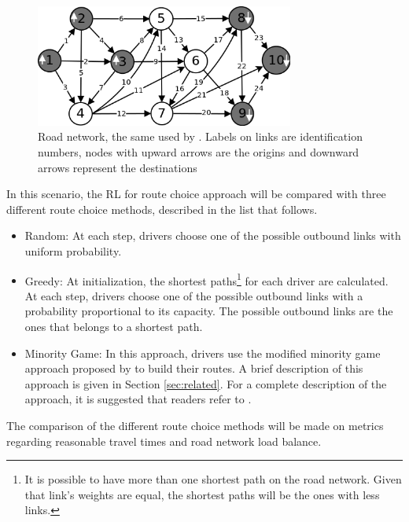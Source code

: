 \documentclass{RITA}
\begin{document}
\begin{figure}[ht]
    \centerline{\includegraphics[width=8.5cm]{img/roadnetwork.png}}
    \caption{Road network, the same used by \cite{Galib&Moser2011}. Labels on links are identification numbers, nodes with upward arrows are the origins and downward arrows represent the destinations}
    \label{fig:roadnetwork}
\end{figure}

In this scenario, the RL for route choice approach will be compared with three different route choice methods, described in the list that follows.

\begin{itemize}
  \item Random: At each step, drivers choose one of the possible outbound links with uniform probability.
  \item Greedy: At initialization, the shortest paths\footnote{It is possible to have more than one shortest path on the road network. Given that link's weights are equal, the shortest paths will be the ones with less links.} for each driver are calculated. At each step, drivers choose one of the possible outbound links with a probability proportional to its capacity. The possible outbound links are the ones that belongs to a shortest path. %
  \item Minority Game: In this approach, drivers use the modified minority game approach proposed by \cite{Galib&Moser2011} to build their routes. A brief description of this approach is given in Section \ref{sec:related}. For a complete description of the approach, it is suggested that readers refer to \cite{Galib&Moser2011}.
\end{itemize}

The comparison of the different route choice methods will be made on metrics regarding reasonable travel times and road network load balance.
\end{document}
